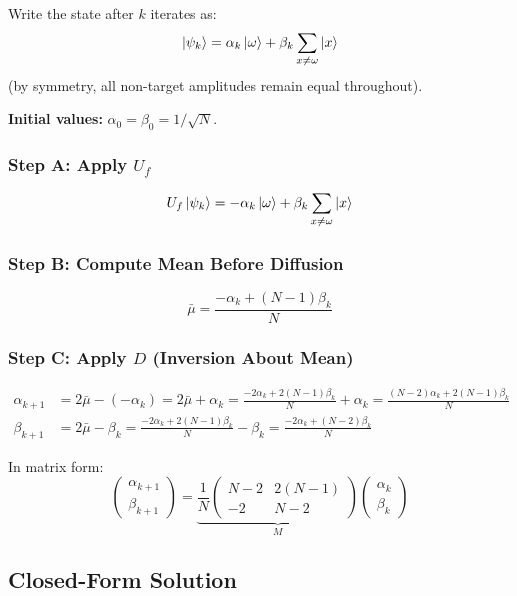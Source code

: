 \documentclass[12pt,a4paper]{article}
\begin{document}
Write the state after $k$ iterates as:
\[
  \ket{\psi_k} = \alpha_k\ket{\omega} + \beta_k\sum_{x\neq\omega}\ket{x}
\]
(by symmetry, all non-target amplitudes remain equal throughout).

\textbf{Initial values:} $\alpha_0 = \beta_0 = 1/\sqrt{N}$.

\subsubsection*{Step A: Apply $U_f$}

\[
  U_f\ket{\psi_k} = -\alpha_k\ket{\omega} + \beta_k\sum_{x\neq\omega}\ket{x}
\]

\subsubsection*{Step B: Compute Mean Before Diffusion}

\[
  \bar{\mu} = \frac{-\alpha_k + (N-1)\beta_k}{N}
\]

\subsubsection*{Step C: Apply $D$ (Inversion About Mean)}

\begin{align}
  \alpha_{k+1} &= 2\bar{\mu} - (-\alpha_k)
    = 2\bar\mu + \alpha_k
    = \frac{-2\alpha_k+2(N-1)\beta_k}{N}+\alpha_k
    = \frac{(N-2)\alpha_k + 2(N-1)\beta_k}{N} \label{eq:rec1}\\[6pt]
  \beta_{k+1}  &= 2\bar{\mu} - \beta_k
    = \frac{-2\alpha_k+2(N-1)\beta_k}{N}-\beta_k
    = \frac{-2\alpha_k+(N-2)\beta_k}{N} \label{eq:rec2}
\end{align}

In matrix form:
\[
  \begin{pmatrix}\alpha_{k+1}\\\beta_{k+1}\end{pmatrix}
  = \underbrace{\frac{1}{N}\begin{pmatrix}N-2 & 2(N-1)\\-2 & N-2\end{pmatrix}}_{M}
  \begin{pmatrix}\alpha_k\\\beta_k\end{pmatrix}
\]

\subsection{Closed-Form Solution}
\end{document}
